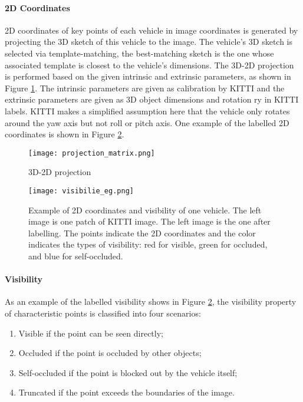 \paragraph{2D Coordinates}

2D coordinates of key points of each vehicle in image coordinates is generated by projecting the 3D sketch of this vehicle to the image. The vehicle's 3D sketch is selected via template-matching, \ie the best-matching sketch is the one whose associated template is closest to the vehicle's dimensions. The 3D-2D projection is performed based on the given intrinsic and extrinsic parameters, as shown in Figure \ref{3D_2D_projection}. The intrinsic parameters are given as calibration by KITTI and the extrinsic parameters are given as 3D object dimensions and rotation ry in KITTI labels. KITTI makes a simplified assumption here that the vehicle only rotates around the yaw axis but not roll or pitch axis. One example of the labelled 2D coordinates is shown in Figure \ref{visibilie_eg}.

\begin{figure}[h]		
	\texttt{[image: projection\_matrix.png]}
	\caption{3D-2D projection}
	\centering
	\label{3D_2D_projection}
\end{figure}

\begin{figure}[h]		
	\texttt{[image: visibilie\_eg.png]}
	\caption{Example of 2D coordinates and visibility of one vehicle. The left image is one patch of KITTI image. The left image is the one after labelling. The points indicate the 2D coordinates and the color indicates the types of visibility: red for visible, green for occluded, and blue for self-occluded.}
	\centering
	\label{visibilie_eg}
\end{figure}



\paragraph{Visibility}

As an example of the labelled visibility shows in Figure \ref{visibilie_eg}, the visibility property of characteristic points is classified into four scenarios: 

\begin{enumerate}[\hspace{0.4cm} i.]
	\itemsep-0.5em 
	\item Visible if the point can be seen directly;
	\item Occluded if the point is occluded by other objects;
	\item Self-occluded if the point is blocked out by the vehicle itself;
	\item Truncated if the point exceeds the boundaries of the image. 
\end{enumerate}

